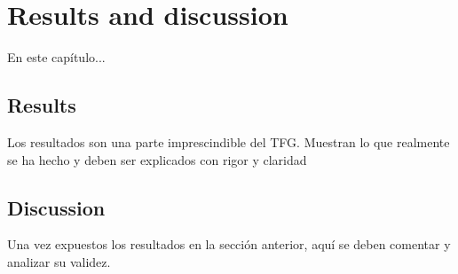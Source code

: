 \chapter{Results and discussion}

En este capítulo...


\section{Results}

Los resultados son una parte imprescindible del TFG. Muestran lo que realmente se ha hecho y deben ser explicados con rigor y claridad

\section{Discussion}

Una vez expuestos los resultados en la sección anterior, aquí se deben comentar y analizar su validez.